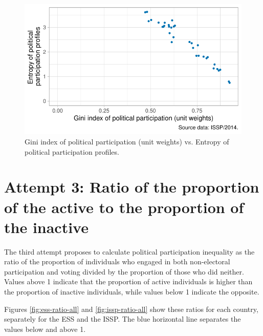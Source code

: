 \documentclass[12pt,]{article}
\begin{document}
\begin{figure}[H]

{\centering \includegraphics{report_files/figure-latex/issp-entropy-1} 

}

\caption{Gini index of political participation (unit weights) vs. Entropy of political participation profiles.}\label{fig:issp-entropy}
\end{figure}

\hypertarget{attempt-3-ratio-of-the-proportion-of-the-active-to-the-proportion-of-the-inactive}{%
\section{Attempt 3: Ratio of the proportion of the active to the proportion of the inactive}\label{attempt-3-ratio-of-the-proportion-of-the-active-to-the-proportion-of-the-inactive}}

The third attempt proposes to calculate political participation inequality as the ratio of the proportion of individuals who engaged in both non-electoral participation and voting divided by the proportion of those who did neither. Values above 1 indicate that the proportion of active individuals is higher than the proportion of inactive individuals, while values below 1 indicate the opposite.

Figures \ref{fig:ess-ratio-all} and \ref{fig:issp-ratio-all} show these ratios for each country, separately for the ESS and the ISSP. The \textcolor{Cerulean}{blue} horizontal line separates the values below and above 1.
\end{document}
